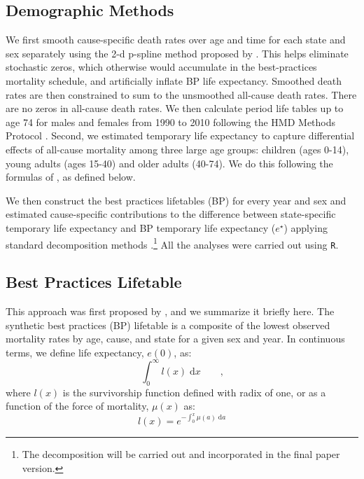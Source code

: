 \documentclass{article}
\newcommand{\dd}{\; \mathrm{d}}
\newcommand{\tc}{\quad\quad\text{,}}
\begin{document}
\subsection*{Demographic Methods}
We first smooth cause-specific death rates over age and time for each
state and sex separately using the 2-d p-spline method proposed by
\citet{GC2012}.
This helps eliminate stochastic zeros, which otherwise would accumulate in the best-practices mortality
schedule, and artificially inflate BP life expectancy. Smoothed death rates are
then constrained to sum to the unsmoothed all-cause death rates. There are no
zeros in all-cause death rates. We then calculate period life tables up to
age 74 for males and females from 1990 to 2010 following the HMD Methods
Protocol \citep{HMDMP}. Second, we estimated temporary life expectancy to
capture differential effects of all-cause mortality among three large age
groups: children (ages 0-14), young adults (ages 15-40) and older adults
(40-74). We do this following the formulas of \citet{arriaga1984}, as
defined below.

We then construct the best practices lifetables (BP) for every year and sex
and estimated cause-specific contributions to the difference between
state-specific temporary life expectancy and BP temporary life expectancy
($e^{\star}$) applying standard decomposition methods
\citep{horiuchi2008}.\footnote{The decomposition will be carried out and
incorporated in the final paper version.} All the analyses were carried out
using \texttt{R}.

\subsection*{Best Practices Lifetable}
This approach was first proposed by \citet{wunsch1975minimum}, and we summarize it
briefly here. The synthetic best practices (BP) lifetable is a composite of the
lowest observed mortality rates by age, cause, and state for a given sex and year. In continuous terms, we define life expectancy, $e(0)$, as:
\begin{equation}
\int _0 ^\infty l(x) \dd x \tc
\end{equation}
where $l(x)$ is the survivorship function defined with radix of one, or as a
function of the force of mortality, $\mu(x)$ as:
\begin{equation}
\label{eq:lx}
l(x) = e^{-\int_0^x \mu(a) \dd a}
\end{equation}
\end{document}
